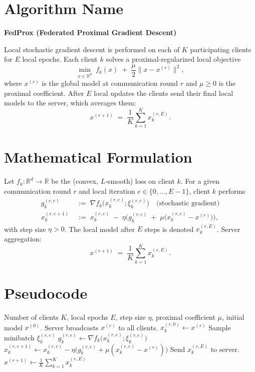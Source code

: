 \documentclass{article}
\newcommand{\R}{\mathbb{R}}
\begin{document}
\section*{Algorithm Name}
\textbf{FedProx (Federated Proximal Gradient Descent)}  

Local stochastic gradient descent is performed on each of $K$ participating clients for $E$ local epochs.  
Each client $k$ solves a proximal‐regularized local objective
\[
\min_{x\in\R^d}\; f_k(x)\;+\;\frac{\mu}{2}\|x-x^{(r)}\|^2,
\]
where $x^{(r)}$ is the global model at communication round $r$ and $\mu\ge 0$ is the proximal coefficient.  
After $E$ local updates the clients send their final local models to the server, which averages them:
\[
x^{(r+1)} \;=\; \frac1K\sum_{k=1}^{K} x_k^{(r,E)} .
\]

\section*{Mathematical Formulation}
Let $f_k:\R^d\to\R$ be the (convex, $L$‑smooth) loss on client $k$.  
For a given communication round $r$ and local iteration $e\in\{0,\dots,E-1\}$, client $k$ performs
\begin{align}
g_{k}^{(r,e)} &\;:=\; \nabla f_k\!\big(x_k^{(r,e)}; \xi_{k}^{(r,e)}\big) \quad\text{(stochastic gradient)}\\
x_k^{(r,e+1)} &\;:=\; x_k^{(r,e)} \;-\; \eta \Big( g_{k}^{(r,e)} \;+\; \mu\big(x_k^{(r,e)}-x^{(r)}\big) \Big),
\tag{1}
\end{align}
with step size $\eta>0$.  
The local model after $E$ steps is denoted $x_k^{(r,E)}$.  
Server aggregation:
\[
x^{(r+1)} \;=\; \frac{1}{K}\sum_{k=1}^{K} x_k^{(r,E)} . \tag{2}
\]

\section*{Pseudocode}
\begin{algorithm}[H]
\caption{FedProx}
\begin{algorithmic}[1]
\Require Number of clients $K$, local epochs $E$, step size $\eta$, proximal coefficient $\mu$, initial model $x^{(0)}$.
    \State Server broadcasts $x^{(r)}$ to all clients.
        \State $x_k^{(r,0)} \gets x^{(r)}$
            \State Sample minibatch $\xi_{k}^{(r,e)}$
            \State $g_{k}^{(r,e)} \gets \nabla f_k\!\big(x_k^{(r,e)}; \xi_{k}^{(r,e)}\big)$
            \State $x_k^{(r,e+1)} \gets x_k^{(r,e)}-\eta\big(g_{k}^{(r,e)}+\mu(x_k^{(r,e)}-x^{(r)})\big)$
        \EndFor
        \State Send $x_k^{(r,E)}$ to server.
    \EndFor
    \State $x^{(r+1)} \gets \frac{1}{K}\sum_{k=1}^{K} x_k^{(r,E)}$
\EndFor
\end{algorithmic}
\end{algorithm}
\end{document}
